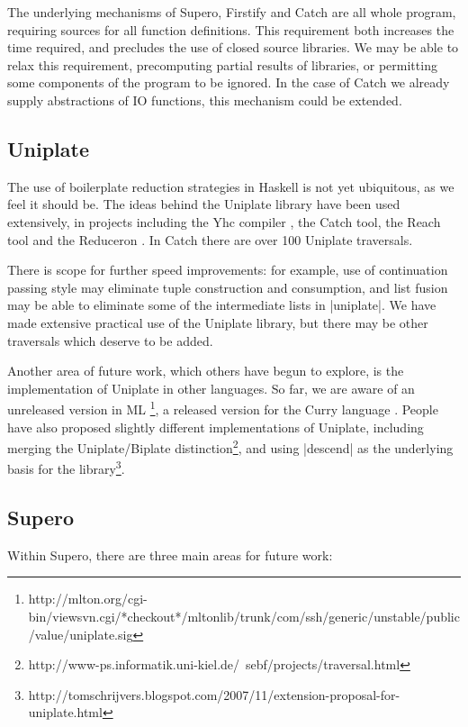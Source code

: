 The underlying mechanisms of Supero, Firstify and Catch are all whole program, requiring sources for all function definitions. This requirement both increases the time required, and precludes the use of closed source libraries. We may be able to relax this requirement, precomputing partial results of libraries, or permitting some components of the program to be ignored. In the case of Catch we already supply abstractions of IO functions, this mechanism could be extended.

\subsection{Uniplate}

The use of boilerplate reduction strategies in Haskell is not yet ubiquitous, as we feel it should be. The ideas behind the Uniplate library have been used extensively, in projects including the Yhc compiler \citep{me:yhc_core}, the Catch tool, the Reach tool \cite{naylor:reach} and the Reduceron \cite{naylor:reduceron}. In Catch there are over 100 Uniplate traversals.

There is scope for further speed improvements: for example, use of continuation passing style may eliminate tuple construction and consumption, and list fusion may be able to eliminate some of the intermediate lists in |uniplate|. We have made extensive practical use of the Uniplate library, but there may be other traversals which deserve to be added.

Another area of future work, which others have begun to explore, is the implementation of Uniplate in other languages. So far, we are aware of an unreleased version in ML \footnote{http://mlton.org/cgi-bin/viewsvn.cgi/*checkout*/mltonlib/trunk/com/ssh/generic/unstable/public/value/uniplate.sig}, a released version for the Curry language \cite{curry}. People have also proposed slightly different implementations of Uniplate, including merging the Uniplate/Biplate distinction\footnote{http://www-ps.informatik.uni-kiel.de/~sebf/projects/traversal.html}, and using |descend| as the underlying basis for the library\footnote{http://tomschrijvers.blogspot.com/2007/11/extension-proposal-for-uniplate.html}.

\subsection{Supero}

Within Supero, there are three main areas for future work:

